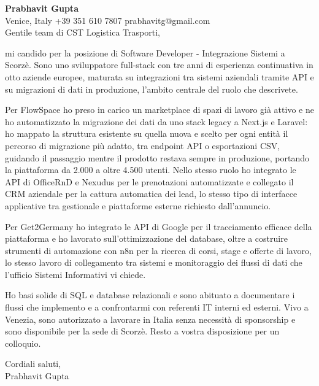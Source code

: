 \documentclass[a4paper,10.5pt]{article}
\begin{document}
\textbf{Prabhavit Gupta}\\
Venice, Italy \textbar{} +39 351 610 7807 \textbar{} prabhavitg@gmail.com\\[10pt]
Gentile team di CST Logistica Trasporti,

mi candido per la posizione di Software Developer - Integrazione Sistemi a Scorzè. Sono uno sviluppatore full-stack con tre anni di esperienza continuativa in otto aziende europee, maturata su integrazioni tra sistemi aziendali tramite API e su migrazioni di dati in produzione, l'ambito centrale del ruolo che descrivete.

Per FlowSpace ho preso in carico un marketplace di spazi di lavoro già attivo e ne ho automatizzato la migrazione dei dati da uno stack legacy a Next.js e Laravel: ho mappato la struttura esistente su quella nuova e scelto per ogni entità il percorso di migrazione più adatto, tra endpoint API o esportazioni CSV, guidando il passaggio mentre il prodotto restava sempre in produzione, portando la piattaforma da 2.000 a oltre 4.500 utenti. Nello stesso ruolo ho integrato le API di OfficeRnD e Nexudus per le prenotazioni automatizzate e collegato il CRM aziendale per la cattura automatica dei lead, lo stesso tipo di interfacce applicative tra gestionale e piattaforme esterne richiesto dall'annuncio.

Per Get2Germany ho integrato le API di Google per il tracciamento efficace della piattaforma e ho lavorato sull'ottimizzazione del database, oltre a costruire strumenti di automazione con n8n per la ricerca di corsi, stage e offerte di lavoro, lo stesso lavoro di collegamento tra sistemi e monitoraggio dei flussi di dati che l'ufficio Sistemi Informativi vi chiede.

Ho basi solide di SQL e database relazionali e sono abituato a documentare i flussi che implemento e a confrontarmi con referenti IT interni ed esterni. Vivo a Venezia, sono autorizzato a lavorare in Italia senza necessità di sponsorship e sono disponibile per la sede di Scorzè. Resto a vostra disposizione per un colloquio.

Cordiali saluti,\\
Prabhavit Gupta
\end{document}
